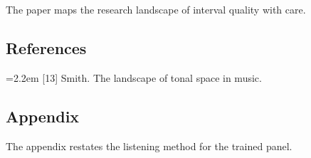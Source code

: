 \documentclass{article}
\begin{document}
The paper maps the research landscape of interval quality with care.
\subsection{References}\label{references}
\hangindent=2.2em [13] Smith. The landscape of tonal space in music.
\subsection{Appendix}\label{appendix}
The appendix restates the listening method for the trained panel.
\end{document}
